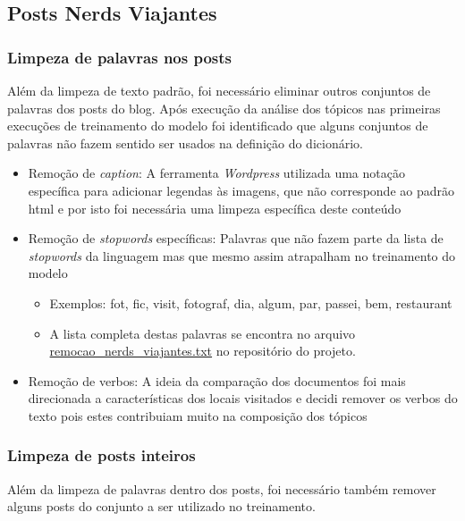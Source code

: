 \subsection{Posts Nerds Viajantes}

\subsubsection{Limpeza de palavras nos posts}

Além da limpeza de texto padrão, foi necessário eliminar outros conjuntos de palavras dos posts do blog. Após execução da análise dos tópicos nas primeiras 
execuções de treinamento do modelo foi identificado que alguns conjuntos de palavras não fazem sentido ser usados na definição do dicionário.

\begin{itemize}
    \item Remoção de \textit{caption}: A ferramenta \textit{Wordpress} utilizada uma notação específica para adicionar legendas às imagens, que não corresponde ao padrão html e por isto foi necessária uma limpeza específica deste conteúdo
    \item Remoção de \textit{stopwords} específicas: Palavras que não fazem parte da lista de \textit{stopwords} da linguagem mas que mesmo assim 
    atrapalham no treinamento do modelo
    \begin{itemize}
        \item Exemplos: fot, fic, visit, fotograf, dia, algum, par, passei, bem, restaurant
        \item A lista completa destas palavras se encontra no arquivo \href{https://github.com/heldergr/tcc-pucmg-2/blob/main/src/python/notebooks/data/remocao_nerds_viajantes.txt}{remocao\_nerds\_viajantes.txt} no repositório do projeto.
    \end{itemize}
    \item Remoção de verbos: A ideia da comparação dos documentos foi mais direcionada a características dos locais visitados e decidi remover os verbos do texto pois estes contribuiam muito na composição dos tópicos
\end{itemize}

\subsubsection{Limpeza de posts inteiros}

Além da limpeza de palavras dentro dos posts, foi necessário também remover alguns posts do conjunto a ser utilizado no treinamento.

